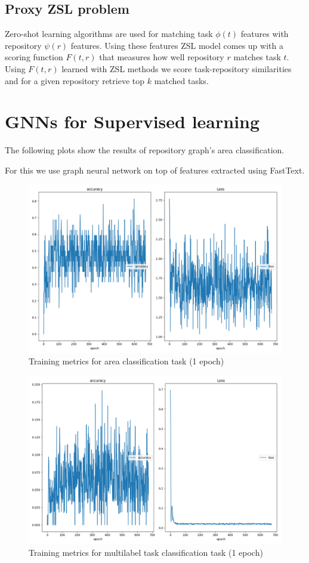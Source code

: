 \documentclass[longabstract,mgr,english]{iithesis}
\begin{document}
\subsection{Proxy ZSL problem}


Zero-shot learning algorithms are used for matching task \(\phi(t)\) features
with repository \(\psi(r)\) features. Using these features ZSL model comes up
with a scoring function $F(t, r)$ that measures how well repository $r$ matches
task $t$. Using \(F(t, r)\) learned with ZSL methods we score task-repository similarities and for a given repository retrieve top \(k\) matched tasks.

\section{GNNs for Supervised learning}
\label{supervised_learning}

The following plots show the results of repository graph's area classification.

For this we use graph neural network on top of features extracted using FastText.

\begin{figure}[htbp]
  \centering
  \includegraphics[width=.9\linewidth]{./img/graph_nn_area_training_losses.png}
  \caption{Training metrics for area classification task (1 epoch)}
\end{figure}


\begin{figure}[htbp]
  \centering
  \includegraphics[width=.9\linewidth]{./img/graph_nn_task_training_losses.png}
  \caption{Training metrics for multilabel task classification task (1 epoch)}
\end{figure}
\end{document}
